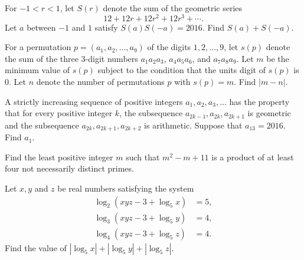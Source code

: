 \documentclass[problems.tex]{subfile}
\begin{document}
	
	
	\begin{problem}
		For $-1 < r < 1$, let $S(r)$ denote the sum of the geometric series \[12 + 12r + 12r^2 + 12r^3 + \cdots.\]Let $a$ between $-1$ and $1$ satisfy $S(a)S(-a)=2016$. Find $S(a) + S(-a)$. %
	\end{problem}
	
	\begin{problem}
		For a permutation $p = (a_1,a_2,\ldots,a_9)$ of the digits $1,2,\ldots,9$, let $s(p)$ denote the sum of the three $3$-digit numbers $a_1a_2a_3$, $a_4a_5a_6$, and $a_7a_8a_9$. Let $m$ be the minimum value of $s(p)$ subject to the condition that the units digit of $s(p)$ is $0$. Let $n$ denote the number of permutations $p$ with $s(p) = m$. Find $|m - n|$. %
	\end{problem}
	
	
	
	\begin{problem}
		A strictly increasing sequence of positive integers $a_1, a_2, a_3, \ldots$ has the property that for every positive integer $k$, the subsequence $a_{2k-1}, a_{2k}, a_{2k+1}$ is geometric and the subsequence $a_{2k}, a_{2k+1}, a_{2k+2}$ is arithmetic. Suppose that $a_{13} = 2016$. Find $a_1$. %
	\end{problem}
	
	
	
	\begin{problem}
		Find the least positive integer $m$ such that $m^2 - m + 11$ is a product of at least four not necessarily distinct primes. %
	\end{problem}
	
	
	
	\begin{problem}
		Let $x,y$ and $z$ be real numbers satisfying the system \begin{align*} \log_2(xyz-3+\log_5 x) &= 5, \\ \log_3(xyz-3+\log_5 y) &= 4, \\ \log_4(xyz-3+\log_5 z) &= 4. \end{align*}Find the value of $|\log_5 x|+|\log_5 y|+|\log_5 z|$. %
	\end{problem}
	
\end{document}
